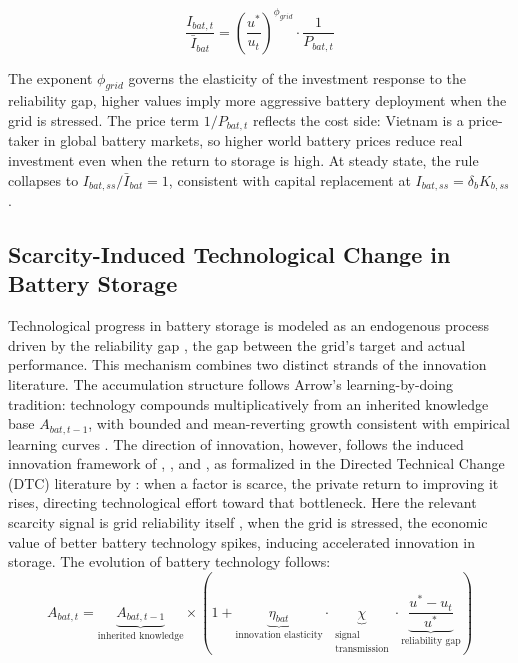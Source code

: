 \documentclass[12pt, a4paper]{article}
\begin{document}
	\begin{equation}
		\frac{I_{bat,t}}{\bar{I}_{bat}} = \left(\frac{u^*}{u_t}\right)^{\phi_{grid}} \cdot \frac{1}{P_{bat,t}}
		\label{eq:battery_investment}
	\end{equation}
	
	The exponent $\phi_{grid}$ governs the elasticity of the investment response to the reliability gap, higher values imply more aggressive battery deployment when the grid is stressed. The price term $1/P_{bat,t}$ reflects the cost side: Vietnam is a price-taker in global battery markets, so higher world battery prices reduce real investment even when the return to storage is high. At steady state, the rule collapses to $I_{bat,ss}/\bar{I}_{bat} = 1$, consistent with capital replacement at $I_{bat,ss} = \delta_b K_{b,ss}$.
	
	\subsection{Scarcity-Induced Technological Change in Battery Storage}
	
	Technological progress in battery storage is modeled as an endogenous process driven by the reliability gap ,  the gap between the grid's target and actual performance. This mechanism combines two distinct strands of the innovation literature. The accumulation structure follows Arrow's \citeyearpar{arrow1962} learning-by-doing tradition: technology compounds multiplicatively from an inherited knowledge base $A_{bat,t-1}$, with bounded and mean-reverting growth consistent with empirical learning curves \citep{nemet2006, kittner2017}. The direction of innovation, however, follows the induced innovation framework of \citet{hicks1932}, \citet{kennedy1964}, and \citet{drandakisphelps1966}, as formalized in the Directed Technical Change (DTC) literature by \citet{acemoglu2002}: when a factor is scarce, the private return to improving it rises, directing technological effort toward that bottleneck. Here the relevant scarcity signal is grid reliability itself ,  when the grid is stressed, the economic value of better battery technology spikes, inducing accelerated innovation in storage. The evolution of battery technology follows:
	\begin{equation}
		A_{bat,t} = \underbrace{A_{bat,t-1}}_{\text{inherited knowledge}} \times \left(1 + \underbrace{\eta_{bat}}_{\text{innovation elasticity}} \cdot \underbrace{\chi}_{\substack{\text{signal}\\\text{transmission}}} \cdot \underbrace{\frac{u^* - u_t}{u^*}}_{\text{reliability gap}}\right)
		\label{eq:learning_by_doing}
	\end{equation}
	
\end{document}
